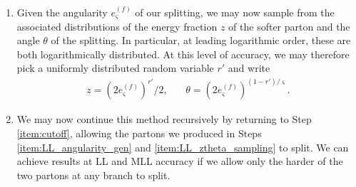 \documentclass[letterpaper,11pt]{article}
\begin{document}
\begin{enumerate}
    \item
    \label{item:LL_ztheta_sampling}
    Given the angularity \(e^{(f)}_\varsigma\) of our splitting, we may now sample from the associated distributions of the energy fraction \(z\) of the softer parton and the angle \(\theta\) of the splitting.
    In particular, at leading logarithmic order, these are both logarithmically distributed.
    At this level of accuracy, we may therefore pick a uniformly distributed random variable \(r'\) and write
    \begin{align}
        z = (2e^{(f)}_\varsigma)^{r'}/2
        ,
        ~~~~~~~~
        \theta = (2e^{(f)}_\varsigma)^{(1-r')/\varsigma}
        .
    \end{align}


    \item
    We may now continue this method recursively by returning to Step \ref{item:cutoff}, allowing the partons we produced in Steps \ref{item:LL_angularity_gen} and \ref{item:LL_ztheta_sampling} to split.
    We can achieve results at LL and MLL accuracy if we allow only the harder of the two partons at any branch to split.
\end{enumerate}
\end{document}
